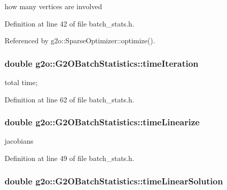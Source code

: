 how many vertices are involved 



Definition at line 42 of file batch\+\_\+stats.\+h.



Referenced by g2o\+::\+Sparse\+Optimizer\+::optimize().

\subsubsection[{\texorpdfstring{time\+Iteration}{timeIteration}}]{\setlength{\rightskip}{0pt plus 5cm}double g2o\+::\+G2\+O\+Batch\+Statistics\+::time\+Iteration}\hypertarget{structg2o_1_1G2OBatchStatistics_a60fbec94ce0b7f26ed99d3f6d2080e47}{}\label{structg2o_1_1G2OBatchStatistics_a60fbec94ce0b7f26ed99d3f6d2080e47}


total time; 



Definition at line 62 of file batch\+\_\+stats.\+h.

\subsubsection[{\texorpdfstring{time\+Linearize}{timeLinearize}}]{\setlength{\rightskip}{0pt plus 5cm}double g2o\+::\+G2\+O\+Batch\+Statistics\+::time\+Linearize}\hypertarget{structg2o_1_1G2OBatchStatistics_ac288190f875b8777b3c24c860a3741d7}{}\label{structg2o_1_1G2OBatchStatistics_ac288190f875b8777b3c24c860a3741d7}


jacobians 



Definition at line 49 of file batch\+\_\+stats.\+h.

\subsubsection[{\texorpdfstring{time\+Linear\+Solution}{timeLinearSolution}}]{\setlength{\rightskip}{0pt plus 5cm}double g2o\+::\+G2\+O\+Batch\+Statistics\+::time\+Linear\+Solution}\hypertarget{structg2o_1_1G2OBatchStatistics_a01fea9876aab94b1e69a6a03c20fd98f}{}\label{structg2o_1_1G2OBatchStatistics_a01fea9876aab94b1e69a6a03c20fd98f}


